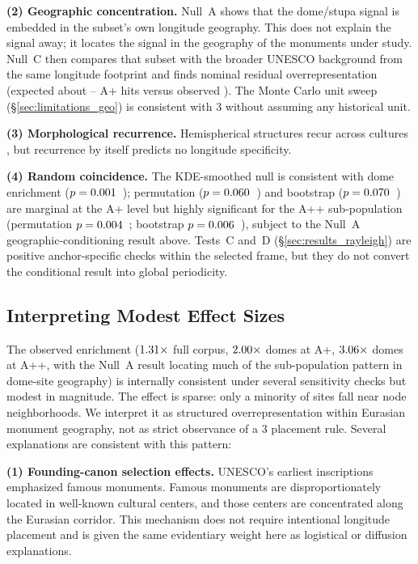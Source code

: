 \textbf{(2) Geographic concentration.}
Null~A shows that the dome/stupa signal is embedded in the subset's
own longitude geography. This does not explain the signal away; it
locates the signal in the geography of the monuments under study.
Null~C then compares that subset with the broader UNESCO background
from the same longitude footprint and finds nominal residual
overrepresentation (expected about
\geoNullDomeRestrictedMeantwo{}--\geoNullDomeRestrictedMeanten{} A+
hits versus observed \NcircTierAp{}). The Monte Carlo unit sweep
(\S\ref{sec:limitations_geo}) is consistent with 3\textdegree{} without
assuming any historical unit.

\textbf{(3) Morphological recurrence.}
Hemispherical structures recur across cultures
\citep{aveni2001skywatchers,aveni2003archaeoastronomy}, but recurrence
by itself predicts no longitude specificity.

\textbf{(4) Random coincidence.}
The KDE-smoothed null is consistent with dome enrichment ($p = 0.001$~\simKDEPSig{});
permutation ($p = 0.060$~\simDomePermPSig{}) and bootstrap
($p = 0.070$~\simDomeBootPSig{}) are marginal at the A+ level
but highly significant for the A++ sub-population
(permutation $p = 0.004$~\pCircAppPermSig{};
bootstrap $p = 0.006$~\pCircAppBootSig{}), subject to the
Null~A geographic-conditioning result above.
Tests~C and~D (\S\ref{sec:results_rayleigh}) are positive
anchor-specific checks within the selected frame, but they do not
convert the conditional result into global periodicity.

\subsection{Interpreting Modest Effect Sizes}
\label{sec:effect_sizes}

The observed enrichment ($1.31\times$ full corpus,
$2.00\times$ domes at A+, $3.06\times$ domes at A++,
with the Null~A result locating much of the sub-population pattern in
dome-site geography) is internally consistent under several
sensitivity checks but modest in magnitude. The effect is sparse:
only a minority of sites fall near node neighborhoods. We interpret it
as structured overrepresentation within Eurasian monument geography,
not as strict observance of a 3\textdegree{} placement rule. Several
explanations are consistent with this pattern:

\textbf{(1) Founding-canon selection effects.} UNESCO's earliest
inscriptions emphasized famous monuments. Famous monuments are
disproportionately located in well-known cultural centers, and those
centers are concentrated along the Eurasian corridor. This mechanism
does not require intentional longitude placement and is given the same
evidentiary weight here as logistical or diffusion explanations.

